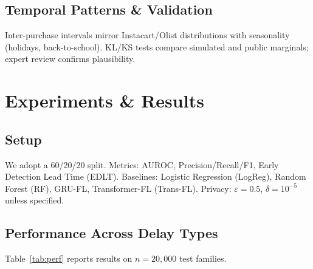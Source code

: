 \documentclass[conference]{IEEEtran}
\newcommand{\eps}{\varepsilon}
\theoremstyle{plain}
\theoremstyle{remark}
\begin{document}
\subsection{Temporal Patterns \& Validation}
Inter-purchase intervals mirror Instacart/Olist distributions with seasonality (holidays, back-to-school). KL/KS tests compare simulated and public marginals; expert review confirms plausibility.

\section{Experiments \& Results}\label{sec:results}
\subsection{Setup}
We adopt a 60/20/20 split. Metrics: AUROC, Precision/Recall/F1, Early Detection Lead Time (EDLT). Baselines: Logistic Regression (LogReg), Random Forest (RF), GRU-FL, Transformer-FL (Trans-FL). Privacy: $\eps{=}0.5$, $\delta{=}10^{-5}$ unless specified.

\subsection{Performance Across Delay Types}
Table~\ref{tab:perf} reports results on $n{=}20{,}000$ test families.
\end{document}
